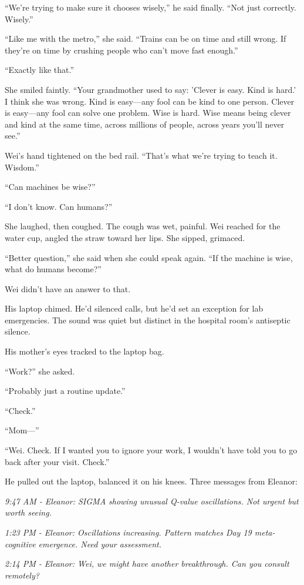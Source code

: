 ``We're trying to make sure it chooses wisely,'' he said finally. ``Not just correctly. Wisely.''

``Like me with the metro,'' she said. ``Trains can be on time and still wrong. If they're on time by crushing people who can't move fast enough.''

``Exactly like that.''

She smiled faintly. ``Your grandmother used to say: 'Clever is easy. Kind is hard.' I think she was wrong. Kind is easy---any fool can be kind to one person. Clever is easy---any fool can solve one problem. Wise is hard. Wise means being clever and kind at the same time, across millions of people, across years you'll never see.''

Wei's hand tightened on the bed rail. ``That's what we're trying to teach it. Wisdom.''

``Can machines be wise?''

``I don't know. Can humans?''

She laughed, then coughed. The cough was wet, painful. Wei reached for the water cup, angled the straw toward her lips. She sipped, grimaced.

``Better question,'' she said when she could speak again. ``If the machine is wise, what do humans become?''

Wei didn't have an answer to that.

His laptop chimed. He'd silenced calls, but he'd set an exception for lab emergencies. The sound was quiet but distinct in the hospital room's antiseptic silence.

His mother's eyes tracked to the laptop bag.

``Work?'' she asked.

``Probably just a routine update.''

``Check.''

``Mom---''

``Wei. Check. If I wanted you to ignore your work, I wouldn't have told you to go back after your visit. Check.''

He pulled out the laptop, balanced it on his knees. Three messages from Eleanor:

\emph{9:47 AM - Eleanor: SIGMA showing unusual Q-value oscillations. Not urgent but worth seeing.}

\emph{1:23 PM - Eleanor: Oscillations increasing. Pattern matches Day 19 meta-cognitive emergence. Need your assessment.}

\emph{2:14 PM - Eleanor: Wei, we might have another breakthrough. Can you consult remotely?}


